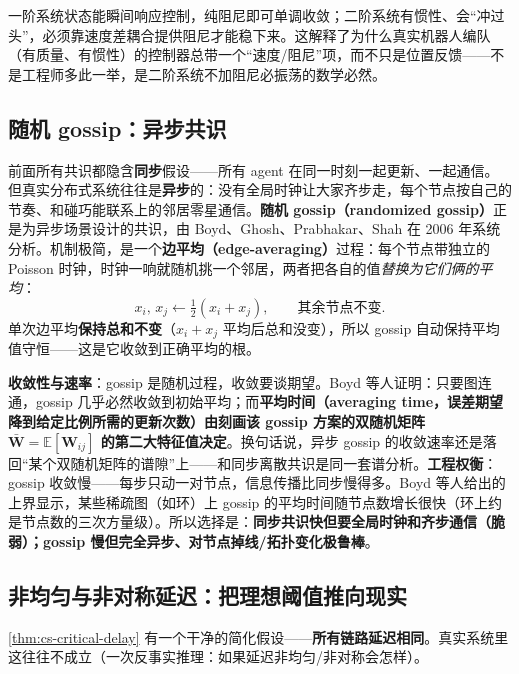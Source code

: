 \begin{insight}\label{ins:cs-inertia}
一阶系统状态能瞬间响应控制，纯阻尼即可单调收敛；二阶系统有惯性、会“冲过头”，必须靠速度差耦合提供阻尼才能稳下来。这解释了为什么真实机器人编队（有质量、有惯性）的控制器总带一个“速度/阻尼”项，而不只是位置反馈——不是工程师多此一举，是二阶系统不加阻尼必振荡的数学必然。
\end{insight}

\subsection{随机 gossip：异步共识}
\label{sec:cs-gossip}

前面所有共识都隐含\textbf{同步}假设——所有 agent 在同一时刻一起更新、一起通信。但真实分布式系统往往是\textbf{异步}的：没有全局时钟让大家齐步走，每个节点按自己的节奏、和碰巧能联系上的邻居零星通信。\textbf{随机 gossip（randomized gossip）}正是为异步场景设计的共识，由 Boyd、Ghosh、Prabhakar、Shah 在 2006 年系统分析\cite{boyd2006gossip}。机制极简，是一个\textbf{边平均（edge-averaging）}过程：每个节点带独立的 Poisson 时钟，时钟一响就随机挑一个邻居，两者把各自的值\emph{替换为它们俩的平均}：
\begin{equation}
  x_i,\,x_j\leftarrow\tfrac12(x_i+x_j),\qquad\text{其余节点不变}.
  \label{eq:cs-gossip}
\end{equation}
单次边平均\textbf{保持总和不变}（$x_i+x_j$ 平均后总和没变），所以 gossip 自动保持平均值守恒——这是它收敛到正确平均的根。

\textbf{收敛性与速率}：gossip 是随机过程，收敛要谈期望。Boyd 等人证明：只要图连通，gossip 几乎必然收敛到初始平均；而\textbf{平均时间（averaging time，误差期望降到给定比例所需的更新次数）由刻画该 gossip 方案的双随机矩阵 $\bar{\mathbf{W}}=\mathbb{E}[\mathbf{W}_{ij}]$ 的第二大特征值决定}。换句话说，异步 gossip 的收敛速率还是落回“某个双随机矩阵的谱隙”上——和同步离散共识是同一套谱分析。\textbf{工程权衡}：gossip 收敛慢——每步只动一对节点，信息传播比同步慢得多。Boyd 等人给出的上界显示，某些稀疏图（如环）上 gossip 的平均时间随节点数增长很快（环上约是节点数的三次方量级）。所以选择是：\textbf{同步共识快但要全局时钟和齐步通信（脆弱）；gossip 慢但完全异步、对节点掉线/拓扑变化极鲁棒}。

\subsection{非均匀与非对称延迟：把理想阈值推向现实}
\label{sec:cs-hetero-delay}

\cref{thm:cs-critical-delay} 有一个干净的简化假设——\textbf{所有链路延迟相同}。真实系统里这往往不成立（一次反事实推理：如果延迟非均匀/非对称会怎样）。

